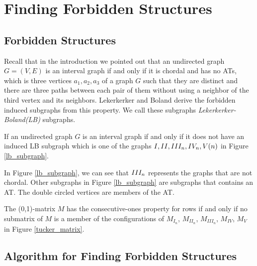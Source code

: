 \section{Finding Forbidden Structures}

\subsection{Forbidden Structures}

Recall that in the introduction we pointed out that an undirected graph $G = (V,E)$ is an interval graph if and only if it is chordal and has no ATs, which is three vertices $a_1,a_2,a_3$ of a graph $G$ such that they are distinct and there are three paths between each pair of them without using a neighbor of the third vertex and its neighbors. Lekerkerker and Boland derive the forbidden induced subgraphs from this property. We call these subgraphs {\em Lekerkerker-Boland(LB)} subgraphs. 

\begin{theorem}
\cite{lekkerkerker1962representation}
If an undirected graph $G$ is an interval graph if and only if it does not have an induced LB subgraph which is one of the graphs $\rom{1}, \rom{2}, \rom{3}_{n}, \rom{4}_{n}, \rom{5}(n)$ in Figure \ref{lb_subgraph}.
\end{theorem}

In Figure \ref{lb_subgraph}, we can see that $\rom{3}_{n}$ represents the graphs that are not chordal. Other subgraphs in Figure \ref{lb_subgraph} are subgraphs that contains an AT. The double circled vertices are members of the AT.


\begin{theorem}
\cite{tucker1972structure}
The (0,1)-matrix $M$ has the consecutive-ones property for rows if and only if no submatrix of $M$ is a member of the configurations of $M_{I_{n}}$, $M_{II_{n}}$, $M_{III_{n}}$, $M_{IV}$, $M_{V}$ in Figure \ref{tucker_matrix}.
\end{theorem}



\subsection{Algorithm for Finding Forbidden Structures}

